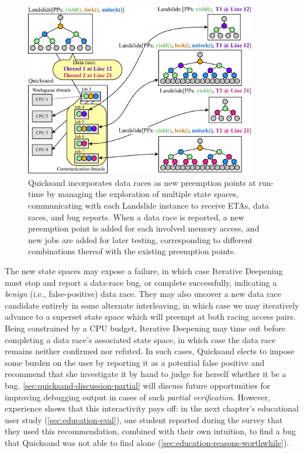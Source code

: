 \begin{figure}[t]
	\begin{center}
        \includegraphics[width=0.9\textwidth]{dr-jobs-v3.pdf}
	\end{center}
	\caption[Quicksand incorporates data races as new preemption points at run-time.]
		{Quicksand incorporates data races as new preemption points at run-time
		by managing the exploration of multiple state spaces,
		communicating with each Landslide instance to receive ETAs, data races, and bug reports.
                When a data race is reported,
                a new preemption point is added for each involved memory access,
                and new jobs are added for later testing,
                corresponding to different combinations thereof with the existing preemption points.}
        \label{fig:new-dr-jobs}
\end{figure}

The new state spaces may expose a failure, in which case Iterative Deepening must stop and report a data-race bug,
or complete successfully, indicating a {\em benign} (i.e., false-positive) data race.
They may also uncover a new data race candidate entirely in some alternate interleaving,
in which case we may iteratively advance to a superset state space which will preempt at both racing access pairs.
Being constrained by a CPU budget,
Iterative Deepening may time out before completing a data race's associated state space,
in which case the data race remains neither confirmed nor refuted.
In such cases, Quicksand elects to impose some burden on the user
by reporting it as a potential false positive
and recommend that she investigate it by hand to judge for herself whether it be a bug.
\cref{sec:quicksand-discussion-partial} will discuss future opportunities for improving
debugging output in cases of such {\em partial verification}.
However, experience shows that this interactivity pays off:
in the next chapter's educational user study (\cref{sec:education-eval}),
one student reported during the survey that they used this recommendation,
combined with their own intuition,
to find a bug that Quicksand was not able to find alone (\cref{sec:education-reasons-worthwhile}).


